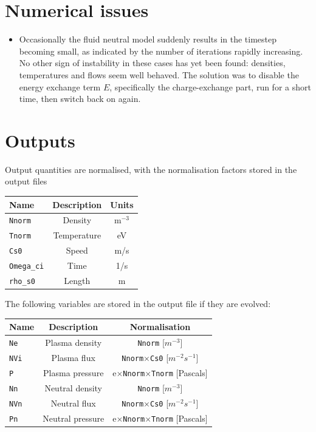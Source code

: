 \documentclass[12pt,a4paper]{article}
\begin{document}
\section{Numerical issues}
\begin{itemize}
\item Occasionally the fluid neutral model suddenly results in the timestep becoming small, as indicated
  by the number of iterations rapidly increasing. No other sign of instability in these cases has yet been found: densities, temperatures
  and flows seem well behaved.
  The solution was to disable the energy exchange term $E$, specifically the charge-exchange part, run for a short time,
  then switch back on again.
\end{itemize}

\section{Outputs}
\label{sec:output}

Output quantities are normalised, with the normalisation factors stored in the output files

\begin{center}
\begin{tabular}{l c c}
  Name & Description & Units \\
  \hline
  \texttt{Nnorm}  & Density  & m$^{-3}$\\
  \texttt{Tnorm}  & Temperature  & eV\\
  \texttt{Cs0}  & Speed  & m/s \\
  \texttt{Omega\_ci} & Time & 1/s \\
  \texttt{rho\_s0} & Length & m \\
  \hline
\end{tabular}
\end{center}

\noindent The following variables are stored in the output file if they are evolved:

\begin{center}
\begin{tabular}{l c c}
  Name & Description & Normalisation \\
  \hline
  \texttt{Ne}  & Plasma density  & \texttt{Nnorm} [$m^{-3}$]\\
  \texttt{NVi} & Plasma flux  & \texttt{Nnorm}$\times$\texttt{Cs0} [$m^{-2}s^{-1}$]\\
  \texttt{P}   & Plasma pressure & e$\times$\texttt{Nnorm}$\times$\texttt{Tnorm} [Pascals] \\
  \texttt{Nn}  & Neutral density & \texttt{Nnorm} [$m^{-3}$] \\
  \texttt{NVn} & Neutral flux  & \texttt{Nnorm}$\times$\texttt{Cs0} [$m^{-2}s^{-1}$]\\
  \texttt{Pn}  & Neutral pressure & e$\times$\texttt{Nnorm}$\times$\texttt{Tnorm} [Pascals] \\
  \hline
\end{tabular}
\end{center}
\end{document}
